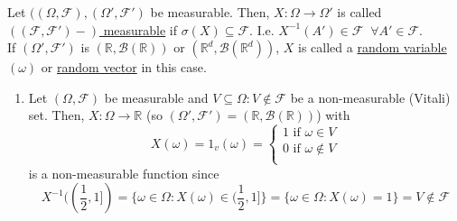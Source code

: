 \documentclass{article}
\newcommand{\R}{\mathbb{R}}
\begin{document}
	\begin{mydef}{}{}
		Let $((\Omega, \mathcal{F}), (\Omega', \mathcal{F}')$ be measurable. Then, $X : \Omega\to\Omega'$ is called \underline{$((\mathcal{F}, \mathcal{F}')-)$ measurable} if $\sigma(X)\subseteq\mathcal{F}$. I.e. $X^{-1}(A')\in\mathcal{F}\;\;\forall A'\in\mathcal{F}$.\\
		
		If $(\Omega', \mathcal{F}')$ is $(\R, \mathcal{B}(\R))$ or $(\R^d, \mathcal{B}(\R^d))$, $X$ is called a \underline{random variable} $(\omega)$ or \underline{random vector} in this case.
	\end{mydef}
	\newpage
	
	\begin{myex}{}{}
		\begin{enumerate}
			\item Let $(\Omega, \mathcal{F})$ be measurable and $V\subseteq\Omega : V\notin\mathcal{F}$ be a non-measurable (Vitali) set. Then, $X : \Omega\to\R$ (so $(\Omega', \mathcal{F}')=(\R, \mathcal{B}(\R))$) with \[
				X(\omega)=1_v(\omega)=\begin{cases}
					1 \mbox{ if } \omega\in V\\
					0 \mbox{ if } \omega\notin V\\			
			\end{cases}
			\]
			is a non-measurable function since $$X^{-1}((\frac{1}{2}, 1])=\{\omega\in\Omega : X(\omega)\in(\frac{1}{2}, 1]\}=\{\omega\in\Omega : X(\omega)=1\}=V\notin\mathcal{F}$$
		\end{enumerate}
	\end{myex}
	
\end{document}
